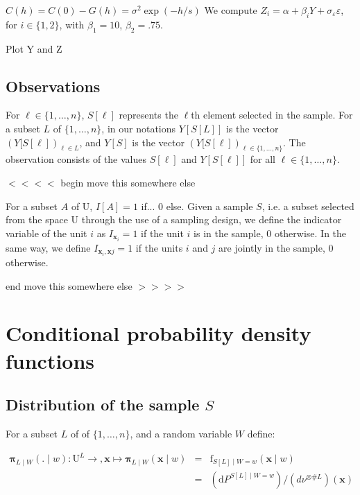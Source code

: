 \documentclass[12pt]{article}
\theoremstyle{definition}
\theoremstyle{remark}
\newcommand{\dominantU}{\nu}
\newcommand{\sampledensity}{\mathbf{\pi}}
\newcommand{\Covariogram}{C}
\newcommand{\density}{\mathrm{f}}
\newcommand{\Semivariogram}{G}
\newcommand{\Sample}{S}
\newcommand{\Pop}{\mathrm{U}}
\newcommand{\position}{\mathbf{x}}
\newcommand{\Sampleindex}{L}
\newcommand{\Signal}{Y}
\newcommand{\Desvar}{Z}
\begin{document}
$\Covariogram(h)=\Covariogram(0)-\Semivariogram(h)=\sigma^2\exp(-h/s)$
We compute $\Desvar_i=\alpha+\beta_i\Signal+\sigma_\varepsilon \varepsilon$, for $i\in\{1,2\}$, with $\beta_1=10$, $\beta_2=.75$.


{\color{red}
Plot Y and Z
}

\subsection{Observations}
For $\ell\in\{1,\ldots,n\}$, $\Sample[\ell]$  represents the $\ell$th element selected in the sample. For a subset $\Sampleindex$ of $\{1,\ldots, n\}$, in our notations $\Signal[\Sample[\Sampleindex]]$ is the vector $(\Signal[\Sample[\ell])_{\ell \in \Sampleindex}$, and $\Signal[\Sample]$ is the vector $(\Signal[\Sample[\ell])_{\ell \in \{1,\ldots,n\}}$. The observation consists of the values $\Sample[\ell]$ and $\Signal[\Sample[\ell]]$ for all $\ell\in\{1,\ldots,n\}$. 


{\color{red} $<<<<$ begin move this somewhere else}

For a subset $A$ of $\Pop$, $I[A]=1 $ if... 0 else.
Given a sample $\Sample$, i.e. a subset selected from the space $\Pop$ through the use of a sampling design, we define the indicator variable of the unit $i$ as $I_{\position_{i}}=1$ if the unit $i$ is in the sample, 0 otherwise. In the same way, we define  $I_{\position_{i},\position{j}}=1$ if the units $i$ and $j$ are jointly in the sample, 0 otherwise. 

{\color{red} end move this somewhere else $>>>>$}



\section{Conditional probability density functions}

\subsection{Distribution of the sample $S$}

For a subset $\Sampleindex$ of of $\{1,\ldots,n\}$, and a random variable $W$ define:

\begin{eqnarray}
\sampledensity_{\Sampleindex\mid W}(.\mid w):\Pop^{\Sampleindex}\to, \position\mapsto \sampledensity_{\Sampleindex\mid W}(\position\mid w)&=&
\density_{\Sample[\Sampleindex]\mid W=w}(\position\mid w)\\&=&
(\mathrm{d}P^{\Sample[\Sampleindex]\mid W=w})/(d\dominantU^{\otimes \#\Sampleindex})(\position)
\end{eqnarray}
\end{document}
